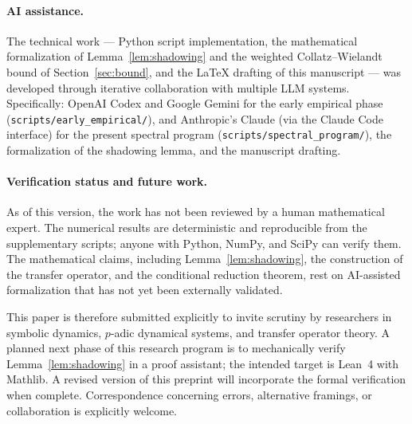 \documentclass[11pt,a4paper]{article}
\theoremstyle{definition}
\begin{document}
\paragraph{AI assistance.}
The technical work — Python script implementation, the mathematical
formalization of Lemma~\ref{lem:shadowing} and the weighted
Collatz--Wielandt bound of Section~\ref{sec:bound}, and the \LaTeX{}
drafting of this manuscript — was developed through iterative
collaboration with multiple LLM systems. Specifically: OpenAI Codex
and Google Gemini for the early empirical phase
(\texttt{scripts/early\_empirical/}), and Anthropic's Claude (via the
Claude Code interface) for the present spectral program
(\texttt{scripts/spectral\_program/}), the formalization of the
shadowing lemma, and the manuscript drafting.

\paragraph{Verification status and future work.}
As of this version, the work has not been reviewed by a human
mathematical expert. The numerical results are deterministic and
reproducible from the supplementary scripts; anyone with Python,
NumPy, and SciPy can verify them. The mathematical claims, including
Lemma~\ref{lem:shadowing}, the construction of the transfer operator,
and the conditional reduction theorem, rest on AI-assisted
formalization that has not yet been externally validated.

This paper is therefore submitted explicitly to invite scrutiny by
researchers in symbolic dynamics, $p$-adic dynamical systems, and
transfer operator theory. A planned next phase of this research
program is to mechanically verify Lemma~\ref{lem:shadowing} in a
proof assistant; the intended target is Lean~4 with Mathlib. A
revised version of this preprint will incorporate the formal
verification when complete. Correspondence concerning errors,
alternative framings, or collaboration is explicitly welcome.
\end{document}
